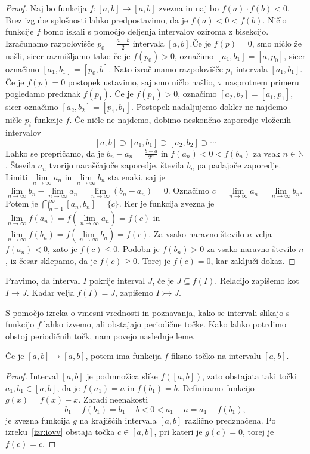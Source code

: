 \documentclass[mat2]{fmfdelo}
\newcommand{\N}{\mathbb N}
\begin{document}
\begin{proof}
Naj bo funkcija $f:[a, b] \to [a, b]$ zvezna in naj bo $f(a)\cdot f(b) < 0$. Brez izgube splošnosti lahko predpostavimo, da je $f(a) < 0 < f(b)$. Ničlo funkcije $f$ bomo iskali s pomočjo deljenja intervalov oziroma z bisekcijo. Izračunamo razpolovišče $p_0=\frac{a+b}{2}$ intervala $[a, b]$.Če je $f(p)=0$, smo ničlo že našli, sicer razmišljamo tako: če je $f(p_0) >0$, označimo $[a_1, b_1] =  [a, p_0]$, sicer označimo $[a_1, b_1] =  [p_0, b]$. Nato izračunamo razpolovišče $p_1$ intervala $[a_1, b_1]$. Če je $f(p)=0$ postopek ustavimo, saj smo ničlo našlio, v nasprotnem primeru pogledamo predznak $f(p_1)$. Če je $f(p_1) >0$, označimo $[a_2, b_2] =  [a_1, p_1]$, sicer označimo $[a_2, b_2] =  [p_1, b_1]$. Postopek nadaljujemo dokler ne najdemo ničle $p_i$ funkcije $f$. Če ničle ne najdemo, dobimo neskončno zaporedje vloženih intervalov 
$$ [a, b] \supset [a_1, b_1] \supset [a_2, b_2] \supset \cdots$$
Lahko se prepričamo, da je $b_n - a_n = \frac{b-a}{2^n}$ in $f(a_n)<0<f(b_n)$ za vsak $n\in \N$. Števila $a_n$ tvorijo naraščajoče zaporedje, števila $b_n$ pa padajoče zaporedje.  Limiti $\lim\limits_{n \to \infty} a_n$ in $\lim\limits_{n \to \infty} b_n$ sta enaki, saj je 
$\lim\limits_{n \to \infty} b_n - \lim\limits_{n \to \infty} a_n = \lim\limits_{n \to \infty} (b_n - a_n) =0$. Označimo $c = \lim\limits_{n \to \infty} a_n = \lim\limits_{n \to \infty} b_n$. Potem je 
$\bigcap\limits_{n=1}^{\infty} [a_n, b_n] = \{c\}$. 
Ker je funkcija zvezna je 
$\lim\limits_{n \to \infty} f(a_n) = f(\lim\limits_{n \to \infty} a_n) = f(c)$
in 
$\lim\limits_{n \to \infty} f(b_n) = f(\lim\limits_{n \to \infty} b_n) = f(c)$.
Za vsako naravno število $n$ velja $f(a_n) <0$, zato je $f(c) \leq 0$. Podobn je $f(b_n) > 0$ za vsako naravno število $n$, iz česar sklepamo, da je $f(c) \geq 0$. Torej je $f(c) = 0$, kar zaključi dokaz.
\end{proof}

\begin{definicija}\label{def:pokritja}
Pravimo, da interval $I$ pokrije interval $J$, če je $J \subseteq f(I)$. Relacijo zapišemo kot $I \rightarrow J$. Kadar velja $f(I) =J$, zapišemo $I \rightarrowtail J$.
\end{definicija}

S pomočjo izreka o vmesni vrednosti in poznavanja, kako se intervali slikajo s funkcijo $f$ lahko izvemo, ali obstajajo periodične točke. Kako lahko potrdimo obstoj periodičnih točk, nam povejo naslednje leme.

\begin{lema}\label{lem:1zanka}
Če je $[a, b] \to [a, b]$, potem ima funkcija $f$ fiksno točko na intervalu $[a, b]$.
\end{lema}
\begin{proof}
Interval $[a, b]$ je podmnožica slike $f([a, b])$, zato obstajata taki točki $a_1, b_1 \in [a, b]$, da je $f(a_1)=a$ in $f(b_1)=b$. Definiramo funkcijo $g(x) = f(x) - x$. Zaradi neenakosti 
$$b_1-f(b_1) =b_1-b<0<a_1-a=a_1-f(b_1),$$
je zvezna funkcija $g$ na krajiščih intervala $[a, b]$ različno predznačena. Po izreku~\ref{izr:iovv} obstaja točka $c \in [a, b]$, pri kateri je $g(c)=0$, torej je $f(c) = c$.
\end{proof}
\end{document}
